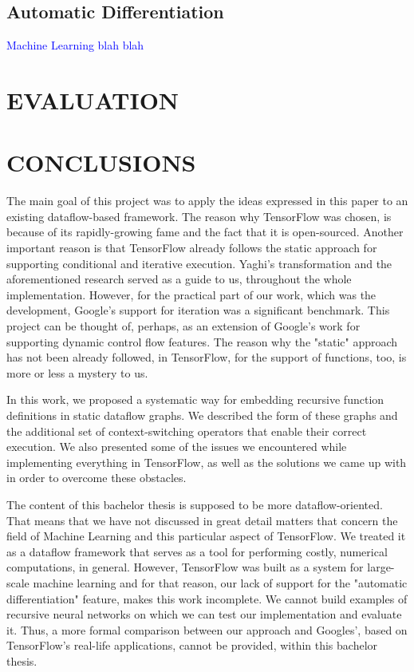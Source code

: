 \documentclass[ack,preface]{dithesis}
\begin{document}
    \section{Automatic Differentiation}

 \textcolor{blue}{Machine Learning blah blah}


\chapter{EVALUATION}

\chapter{CONCLUSIONS}

The main goal of this project was to apply the ideas expressed in this \cite{Rondogiannis:1997} paper to an existing dataflow-based framework. The reason why TensorFlow was chosen, is because of its rapidly-growing fame and the fact that it is open-sourced. Another important reason is that TensorFlow already follows the static approach for supporting conditional and iterative execution. Yaghi's transformation and the aforementioned research  served as a guide to us, throughout the whole implementation.  However, for the practical part of our work, which was the development,  Google's support for iteration was a significant benchmark. This project can be thought of, perhaps, as an extension of Google's work for supporting dynamic control flow features. The reason why the "static" approach has not been already followed, in TensorFlow, for the support of functions, too,  is more or less a mystery to us.

In this work,  we proposed a systematic way for embedding recursive function definitions in static dataflow graphs. We described the form of these graphs and the additional set of context-switching operators that enable their correct execution. We also presented some of the issues we encountered while implementing everything in TensorFlow, as well as the solutions we came up with in order to overcome these obstacles.

The content of this bachelor thesis is supposed to be more dataflow-oriented. That means that we have not discussed in great detail matters that concern the field of  Machine Learning and this particular aspect of TensorFlow. We treated it as a dataflow framework that serves as a tool for performing  costly, numerical computations, in general. However, TensorFlow was  built as a system for large-scale machine learning and for that reason, our lack of support for the "automatic differentiation" feature, makes this work incomplete. We cannot build examples of recursive neural networks on which we can test our implementation and evaluate it.  Thus, a more formal comparison between our approach and Googles', based on TensorFlow's real-life applications, cannot be provided, within this bachelor thesis.
\end{document}
